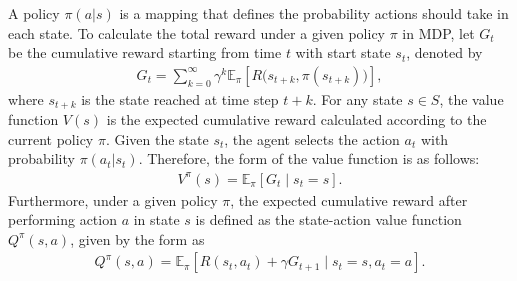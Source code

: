A policy $\pi(a | s)$ is a mapping that defines the probability actions should take in each state.
To calculate the total reward under a given policy $\pi$ in MDP, let $G_t$ be the cumulative reward starting from time $t$ with start state $s_t$, denoted by
\begin{align*}
G_t = \sum_{k=0}^{\infty} \gamma^k \mathbb{E}_{\pi}[R\bigl(s_{t+k}, \pi(s_{t+k})\bigr)],
\end{align*}
where $s_{t+k}$ is the state reached at time step $t+k$. For any state \( s \in S \), the value function \( V(s) \) is the expected cumulative reward calculated according to the current policy \( \pi \). Given the state \( s_t \), the agent selects the action $a_t$ with probability $\pi(a_t | s_t)$. Therefore, the form of the value function is as follows:
\begin{align*}
V^\pi(s) = \mathbb{E}_{\pi}\left[G_t \mid s_t = s\right].
\end{align*}
Furthermore, under a given policy \( \pi \), the expected cumulative reward after performing action \( a \) in state \( s \) is defined as the state-action value function \( Q^\pi(s, a) \), given by the form as
\begin{align*}
Q^\pi(s, a) = \mathbb{E}_{\pi}\left[ R(s_{t}, a_{t}) + \gamma G_{t+1} \mid s_t = s, a_t = a \right].
\end{align*}




